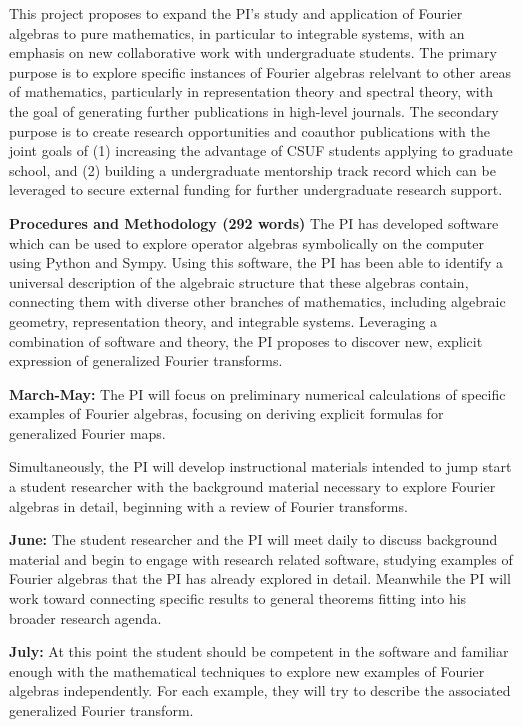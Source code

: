 \documentclass[12pt,letterpaper]{article}
\theoremstyle{definition}
\begin{document}
This project proposes to expand the PI's study and application of Fourier algebras to pure mathematics, in particular to integrable systems, with an emphasis on new collaborative work with undergraduate students.
The primary purpose is to explore specific instances of Fourier algebras relelvant to other areas of mathematics, particularly in representation theory and spectral theory, with the goal of generating further publications in high-level journals.  The secondary purpose is to create research opportunities and coauthor publications with the joint goals of (1) increasing the advantage of CSUF students applying to graduate school, and (2) building a undergraduate mentorship track record which can be leveraged to secure external funding for further undergraduate research support.


\newpage
\noindent\textbf{Procedures and Methodology (292 words)}
The PI has developed software which can be used to explore operator algebras
symbolically on the computer using Python and Sympy.  Using this software,
the PI has been able to identify a universal description of the algebraic
structure that these algebras contain, connecting them with diverse other
branches of mathematics, including algebraic geometry, representation theory,
and integrable systems.  Leveraging a combination of software and theory, the
PI proposes to discover new, explicit expression of generalized Fourier
transforms.

\textbf{March-May:} The PI will focus on preliminary numerical calculations
of specific examples of Fourier algebras, focusing on deriving
explicit formulas for generalized Fourier maps.  

Simultaneously, the PI will develop instructional materials intended to jump start a student researcher with the background material necessary to explore
Fourier algebras in detail, beginning with a review of Fourier transforms.

\textbf{June:} The student researcher and the PI will meet daily to discuss
background material and begin to engage with research related software,
studying examples of Fourier algebras that the PI has already explored in
detail.  Meanwhile the PI will work toward connecting specific results to
general theorems fitting into his broader research agenda.

\textbf{July:} At this point the student should be competent in the software
and familiar enough with the mathematical techniques to explore new examples
of Fourier algebras independently.  For each example, they will try to
describe the associated generalized Fourier transform.
\end{document}
